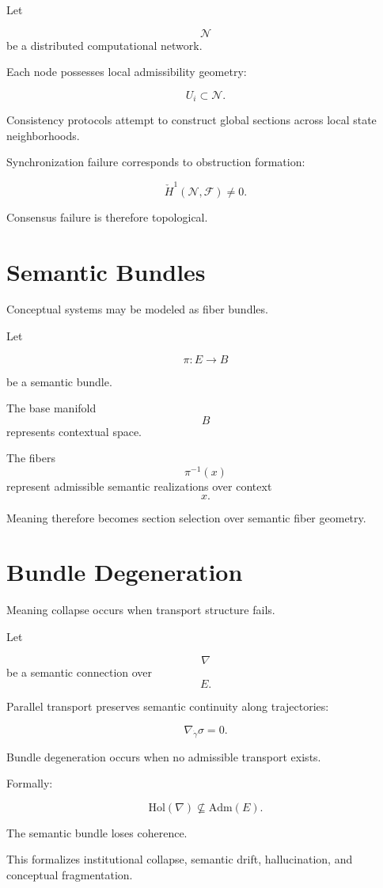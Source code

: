 \documentclass[12pt,openany]{book}
\theoremstyle{plain}
\theoremstyle{definition}
\theoremstyle{remark}
\begin{document}
Let

\[
\mathcal{N}
\]
be a distributed computational network.

Each node possesses local admissibility geometry:

\[
U_i
\subset
\mathcal{N}.
\]

Consistency protocols attempt to construct global sections across
local state neighborhoods.

Synchronization failure corresponds to obstruction formation:

\[
\check{H}^1(\mathcal{N},\mathcal{F})
\neq
0.
\]

Consensus failure is therefore topological.

\section{Semantic Bundles}

Conceptual systems may be modeled as fiber bundles.

Let

\[
\pi :
E\to B
\]

be a semantic bundle.

The base manifold
\[
B
\]
represents contextual space.

The fibers
\[
\pi^{-1}(x)
\]
represent admissible semantic realizations over context
\[
x.
\]

Meaning therefore becomes section selection over semantic fiber
geometry.

\section{Bundle Degeneration}

Meaning collapse occurs when transport structure fails.

Let

\[
\nabla
\]
be a semantic connection over
\[
E.
\]

Parallel transport preserves semantic continuity along
trajectories:

\[
\nabla_{\dot\gamma}\sigma
=
0.
\]

Bundle degeneration occurs when no admissible transport exists.

Formally:

\[
\mathrm{Hol}(\nabla)
\not\subseteq
\mathrm{Adm}(E).
\]

The semantic bundle loses coherence.

This formalizes institutional collapse, semantic drift,
hallucination, and conceptual fragmentation.
\end{document}
